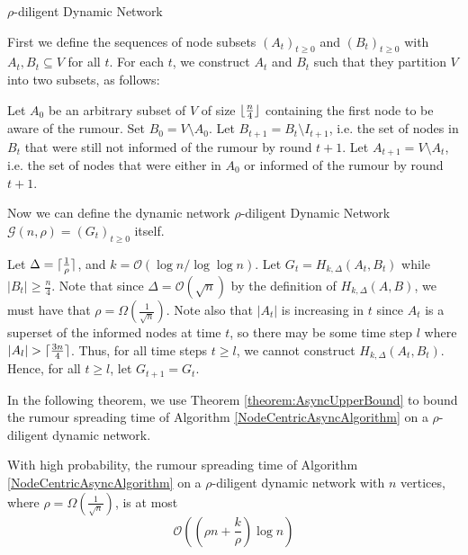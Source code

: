 \begin{definition}
	$\rho$-diligent Dynamic Network
	
	First we define the sequences of node subsets $(A_t)_{t\geq 0}$ and $(B_t)_{t\geq0}$ with $A_t, B_t \subseteq V$ for all $t$. For each $t$, we construct $A_t$ and $B_t$ such that they partition $V$ into two subsets, as follows:

	Let $A_0$ be an arbitrary subset of $V$ of size $\lfloor\frac{n}{4}\rfloor$ containing the first node to be aware of the rumour. %
	Set $B_0 = V \setminus A_0$. Let $B_{t+1} = B_t \setminus I_{t+1}$, i.e. the set of nodes in $B_t$ that were still not informed of the rumour by round $t+1$. %
	Let $A_{t+1} = V \setminus A_t$, i.e. the set of nodes that were either in $A_0$ or informed of the rumour by round $t+1$.

	Now we can define the dynamic network $\rho$-diligent Dynamic Network $\mathcal{G}(n, \rho) = (G_t)_{t\geq 0}$ itself. 

	Let $\Delta = \lceil\frac{1}{\rho}\rceil$, and $k = \mathcal{O}(\log n / \log \log n)$.
	Let $G_t = H_{k, \Delta}(A_t, B_t)$ while $|B_t| \geq \frac{n}{4}$. Note that since $\Delta = \mathcal{O}(\sqrt{n})$ by the definition of $H_{k, \Delta}(A,B)$, we must have that $\rho = \Omega\left(\frac{1}{\sqrt{n}}\right)$.
	Note also that $|A_t|$ is increasing in $t$ since $A_t$ is a superset of the informed nodes at time $t$, so there may be some time step $l$ where $|A_l| > \lceil\frac{3n}{4}\rceil$. Thus, for all time steps $t \geq l$, we cannot construct $H_{k, \Delta}(A_t,B_t)$. Hence, for all $t \geq l$, let $G_{t+1} = G_t$.
\end{definition}

In the following theorem, we use Theorem \ref{theorem:AsyncUpperBound} to bound the rumour spreading time of Algorithm \ref{NodeCentricAsyncAlgorithm} on a $\rho$-diligent dynamic network.

\begin{theorem}
	With high probability, the rumour spreading time of Algorithm \ref{NodeCentricAsyncAlgorithm} on a $\rho$-diligent dynamic network with $n$ vertices, where $\rho = \Omega(\frac{1}{\sqrt{n}})$, is at most 
	$$
		\mathcal{O}\left(\left(\rho n + \frac{k}{\rho}\right)\log n\right)
	$$
\end{theorem}

